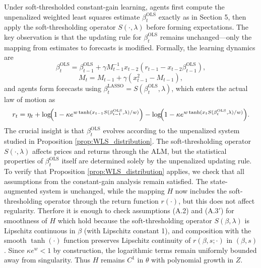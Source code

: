 Under soft-thresholded constant-gain learning, agents first compute the unpenalized weighted least squares estimate $\beta^{\text{OLS}}_t$ exactly as in Section 5, then apply the soft-thresholding operator $S(\cdot,\lambda)$ before forming expectations. 
The key observation is that the updating rule for $\beta^{\text{OLS}}_t$ remains unchanged—only the mapping from estimates to forecasts is modified.
Formally, the learning dynamics are
\[
\beta^{\text{OLS}}_t = \beta^{\text{OLS}}_{t-1} + \gamma M^{-1}_{t-1} x_{t-2} (r_{t-1} - x_{t-2} \beta^{\text{OLS}}_{t-1}),
\]
\[
M_t = M_{t-1} + \gamma (x_{t-1}^2 - M_{t-1}),
\]
and agents form forecasts using $\beta_t^{\text{LASSO}} = S(\beta^{\text{OLS}}_t, \lambda)$, which enters the actual law of motion as
\[
r_{t} = \eta_{t} + \log\!\Bigl(1-\kappa e^{w\tanh(x_{t-1} S(\beta^{\text{OLS}}_{t-1}, \lambda)/w)}\Bigr) - \log\!\Bigl(1-\kappa e^{w\tanh(x_{t} S(\beta^{\text{OLS}}_{t}, \lambda)/w)}\Bigr).
\]
The crucial insight is that $\beta^{\text{OLS}}_t$ evolves according to the unpenalized system studied in Proposition \ref{prop:WLS_distribution}. The soft-thresholding operator $S(\cdot,\lambda)$ affects prices and returns through the ALM, but the statistical properties of $\beta^{\text{OLS}}_t$ itself are determined solely by the unpenalized updating rule. 
To verify that Proposition \ref{prop:WLS_distribution} applies, we check that all assumptions from the constant-gain analysis remain satisfied. The state-augmented system is unchanged, while the mapping $H$ now includes the soft-thresholding operator through the return function $r(\cdot)$, but this does not affect regularity.
Therfore it is enough to check assumptions (A.2) and (A.3$'$) for smoothness of $H$ which hold because
the soft-thresholding operator $S(\beta,\lambda)$ is Lipschitz continuous in $\beta$ (with Lipschitz constant 1), and composition with the smooth $\tanh(\cdot)$ function preserves Lipschitz continuity of $r(\beta,s;\cdot)$ in $(\beta,s)$. 
Since $\kappa e^w < 1$ by construction, the logarithmic terms remain uniformly bounded away from singularity. Thus $H$ remains $C^1$ in $\theta$ with polynomial growth in $Z$.

